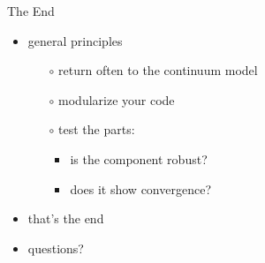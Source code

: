 \begin{frame}{The End}

\begin{itemize}
\item general principles
  \begin{itemize}
  \item[$\circ$] \alert{return often to the continuum model}
  \item[$\circ$] \alert{modularize your code}
  \item[$\circ$] \alert{test the parts}:
    \begin{itemize}
    \item is the component robust?
    \item does it show convergence?
    \end{itemize}
  \end{itemize}

\bigskip
\item that's the end
\item \alert{questions?}
\end{itemize}
\end{frame}
